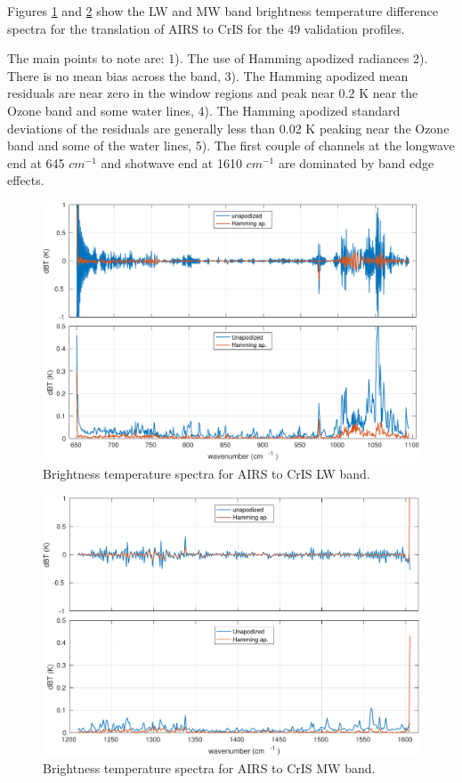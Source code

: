 \documentclass[twocolumn,10pt]{article}
\begin{document}
Figures \ref{fig:1a} and \ref{fig:1b} show the LW and MW band brightness temperature difference spectra for the translation of AIRS to CrIS for the 49 validation profiles.

The main points to note are: 1). The use of Hamming apodized radiances 2). There is no mean bias across the band, 3). The Hamming apodized mean residuals are near zero in the window regions and peak near 0.2 K near the Ozone band and some water lines, 4). The Hamming apodized standard deviations of the residuals are generally less than 0.02 K peaking near the Ozone band and some of the water lines, 5). The first couple of channels at the longwave end at 645 $cm^{-1}$ and shotwave end at 1610 $cm^{-1}$ are dominated by band edge effects.

\begin{figure}[htb]
\centering
\includegraphics[width=\linewidth]{./figs/airs2cris_vs_truth_LW.pdf}
\caption{\label{fig:orgparagraph1}
  Brightness temperature spectra for AIRS to CrIS LW band.}
\label{fig:1a}
\end{figure}

\begin{figure}[htb]
\centering
\includegraphics[width=\linewidth]{./figs/airs2cris_vs_truth_MW.pdf}
\caption{\label{fig:orgparagraph2}
  Brightness temperature spectra for AIRS to CrIS MW band.}
\label{fig:1b}
\end{figure}
\end{document}

